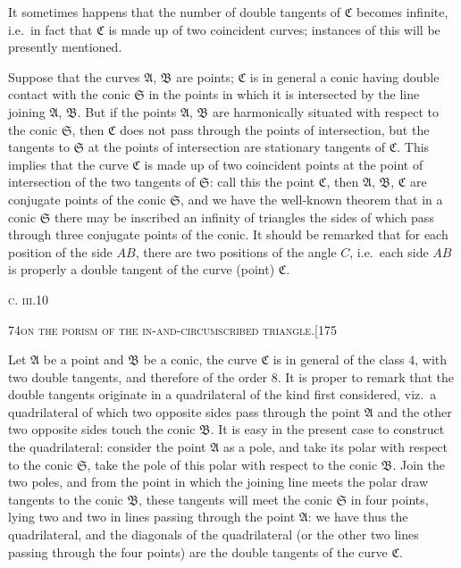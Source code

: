 \documentclass[11pt]{article}
\begin{document}
It sometimes happens that the number of double tangents of $\mathfrak{C}$ becomes infinite,
i.e.\ in fact that $\mathfrak{C}$ is made up of two coincident curves; instances of this will be
presently mentioned.

Suppose that the curves $\mathfrak{A}$, $\mathfrak{B}$ are points; $\mathfrak{C}$ is in general a conic having double
contact with the conic $\mathfrak{S}$ in the points in which it is intersected by the line joining
$\mathfrak{A}$, $\mathfrak{B}$. But if the points $\mathfrak{A}$, $\mathfrak{B}$ are harmonically situated with respect to the conic $\mathfrak{S}$,
then $\mathfrak{C}$ does not pass through the points of intersection, but the tangents to $\mathfrak{S}$ at
the points of intersection are stationary tangents of $\mathfrak{C}$. This implies that the curve
$\mathfrak{C}$ is made up of two coincident points at the point of intersection of the two
tangents of $\mathfrak{S}$: call this the point $\mathfrak{C}$, then $\mathfrak{A}$, $\mathfrak{B}$, $\mathfrak{C}$ are conjugate points of the
conic $\mathfrak{S}$, and we have the well-known theorem that in a conic $\mathfrak{S}$ there may be
inscribed an infinity of triangles the sides of which pass through three conjugate
points of the conic. It should be remarked that for each position of the side $AB$,
there are two positions of the angle $C$, i.e.\ each side $AB$ is properly a double tan\-gent of the curve (point) $\mathfrak{C}$.

\bigskip
\hfill\textsc{c. iii.}\hfill 10

\newpage

\begin{center}
\small\textsc{74}\hfill\textsc{on the porism of the in-and-circumscribed triangle.}\hfill[175
\end{center}

\medskip

\noindent Let $\mathfrak{A}$ be a point and $\mathfrak{B}$ be a conic, the curve $\mathfrak{C}$ is in general of the class $4$,
with two double tangents, and therefore of the order $8$. It is proper to remark that
the double tangents originate in a quadrilateral of the kind first considered, viz.\ a
quadrilateral of which two opposite sides pass through the point $\mathfrak{A}$ and the other
two opposite sides touch the conic $\mathfrak{B}$. It is easy in the present case to construct
the quadrilateral: consider the point $\mathfrak{A}$ as a pole, and take its polar with respect to
the conic $\mathfrak{S}$, take the pole of this polar with respect to the conic $\mathfrak{B}$. Join the two
poles, and from the point in which the joining line meets the polar draw tangents
to the conic $\mathfrak{B}$, these tangents will meet the conic $\mathfrak{S}$ in four points, lying two and
two in lines passing through the point $\mathfrak{A}$: we have thus the quadrilateral, and the
diagonals of the quadrilateral (or the other two lines passing through the four points)
are the double tangents of the curve $\mathfrak{C}$.
\end{document}
